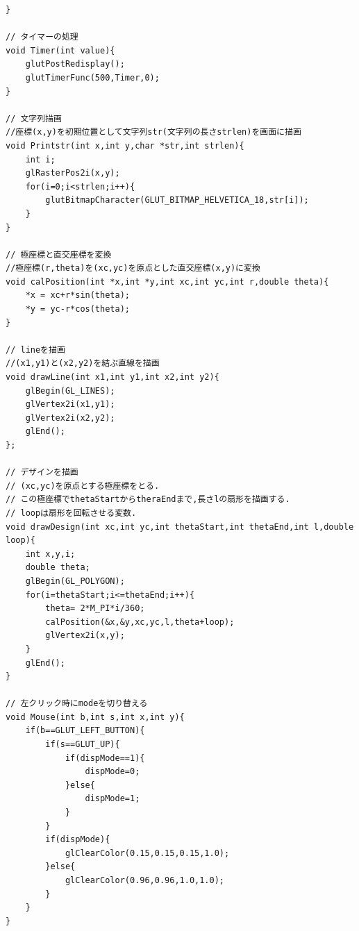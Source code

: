 \documentclass[a4j]{jarticle}
\begin{document}
\begin{lstlisting}[basicstyle=\ttfamily\footnotesize, frame=single,label=pro,caption=時計アプリのソースコード]
}

// タイマーの処理
void Timer(int value){
    glutPostRedisplay();
    glutTimerFunc(500,Timer,0);
}

// 文字列描画
//座標(x,y)を初期位置として文字列str(文字列の長さstrlen)を画面に描画
void Printstr(int x,int y,char *str,int strlen){
    int i;
    glRasterPos2i(x,y);
    for(i=0;i<strlen;i++){
        glutBitmapCharacter(GLUT_BITMAP_HELVETICA_18,str[i]);
    }
}

// 極座標と直交座標を変換
//極座標(r,theta)を(xc,yc)を原点とした直交座標(x,y)に変換
void calPosition(int *x,int *y,int xc,int yc,int r,double theta){
    *x = xc+r*sin(theta);
    *y = yc-r*cos(theta);
}

// lineを描画
//(x1,y1)と(x2,y2)を結ぶ直線を描画
void drawLine(int x1,int y1,int x2,int y2){
    glBegin(GL_LINES);
    glVertex2i(x1,y1);
    glVertex2i(x2,y2);
    glEnd();
};

// デザインを描画
// (xc,yc)を原点とする極座標をとる.
// この極座標でthetaStartからtheraEndまで,長さlの扇形を描画する.
// loopは扇形を回転させる変数.
void drawDesign(int xc,int yc,int thetaStart,int thetaEnd,int l,double loop){
    int x,y,i;
    double theta;
    glBegin(GL_POLYGON);
    for(i=thetaStart;i<=thetaEnd;i++){
        theta= 2*M_PI*i/360;
        calPosition(&x,&y,xc,yc,l,theta+loop);
        glVertex2i(x,y);
    }
    glEnd();
}

// 左クリック時にmodeを切り替える
void Mouse(int b,int s,int x,int y){
    if(b==GLUT_LEFT_BUTTON){
        if(s==GLUT_UP){
            if(dispMode==1){
                dispMode=0;
            }else{
                dispMode=1;
            }
        }
        if(dispMode){
            glClearColor(0.15,0.15,0.15,1.0);
        }else{
            glClearColor(0.96,0.96,1.0,1.0);
        }
    }
}
        \end{lstlisting}
\end{document}
